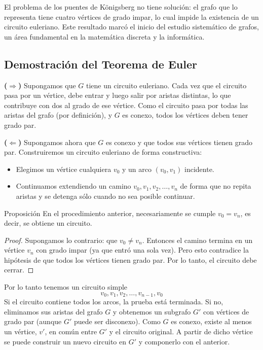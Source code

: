El problema de los puentes de Königsberg no tiene solución: el grafo que lo representa tiene cuatro vértices de grado impar, lo cual impide la existencia de un circuito euleriano. Este resultado marcó el inicio del estudio sistemático de grafos, un área fundamental en la matemática discreta y la informática.

\subsection{Demostración del Teorema de Euler}

\textbf{($\Rightarrow$)} Supongamos que $G$ tiene un circuito euleriano. Cada vez que el circuito pasa por un vértice, debe entrar y luego salir por aristas distintas, lo que contribuye con dos al grado de ese vértice. Como el circuito pasa por todas las aristas del grafo (por definición), y $G$ es conexo, todos los vértices deben tener grado par.

\medskip

\textbf{($\Leftarrow$)} Supongamos ahora que $G$ es conexo y que todos sus vértices tienen grado par. Construiremos un circuito euleriano de forma constructiva:

\begin{itemize}
  \item Elegimos un vértice cualquiera \( v_0 \) y un arco \( (v_0, v_1) \) incidente.
  \item Continuamos extendiendo un camino \( v_0, v_1, v_2, \dots, v_n \) de forma que no repita aristas y se detenga sólo cuando no sea posible continuar.
\end{itemize}

\begin{thmblock}{Proposición}
En el procedimiento anterior, necesariamente se cumple \( v_0 = v_n \), es decir, se obtiene un circuito.
\end{thmblock}

\begin{proof}
Supongamos lo contrario: que \( v_0 \neq v_n \). Entonces el camino termina en un vértice \( v_n \) con grado impar (ya que entró una sola vez). Pero esto contradice la hipótesis de que todos los vértices tienen grado par. Por lo tanto, el circuito debe cerrar.
\end{proof}

Por lo tanto tenemos un circuito simple 
$$v_0, v_1, v_2, \dots, v_{n-1}, v_0$$
Si el circuito contiene todos los arcos, la prueba está
terminada. 
Si no, eliminamos sus aristas del grafo \( G \) y obtenemos un subgrafo \( G' \) con vértices de grado par (aunque $G'$ puede ser disconexo). Como \( G \) es conexo, existe al menos un vértice, $v'$, en común entre \( G' \) y el circuito original. A partir de dicho vértice se puede construir un nuevo circuito en \( G' \) y componerlo con el anterior.




